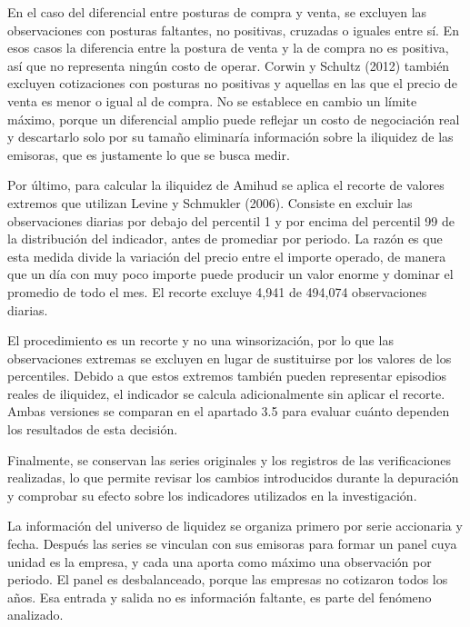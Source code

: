 En el caso del diferencial entre posturas de compra y venta, se excluyen las observaciones con posturas faltantes, no positivas, cruzadas o iguales entre sí. En esos casos la diferencia entre la postura de venta y la de compra no es positiva, así que no representa ningún costo de operar. Corwin y Schultz (2012) también excluyen cotizaciones con posturas no positivas y aquellas en las que el precio de venta es menor o igual al de compra. No se establece en cambio un límite máximo, porque un diferencial amplio puede reflejar un costo de negociación real y descartarlo solo por su tamaño eliminaría información sobre la iliquidez de las emisoras, que es justamente lo que se busca medir.

Por último, para calcular la iliquidez de Amihud se aplica el recorte de valores extremos que utilizan Levine y Schmukler (2006). Consiste en excluir las observaciones diarias por debajo del percentil 1 y por encima del percentil 99 de la distribución del indicador, antes de promediar por periodo. La razón es que esta medida divide la variación del precio entre el importe operado, de manera que un día con muy poco importe puede producir un valor enorme y dominar el promedio de todo el mes. El recorte excluye 4,941 de 494,074 observaciones diarias.

El procedimiento es un recorte y no una winsorización, por lo que las observaciones extremas se excluyen en lugar de sustituirse por los valores de los percentiles. Debido a que estos extremos también pueden representar episodios reales de iliquidez, el indicador se calcula adicionalmente sin aplicar el recorte. Ambas versiones se comparan en el apartado 3.5 para evaluar cuánto dependen los resultados de esta decisión.

Finalmente, se conservan las series originales y los registros de las verificaciones realizadas, lo que permite revisar los cambios introducidos durante la depuración y comprobar su efecto sobre los indicadores utilizados en la investigación.


La información del universo de liquidez se organiza primero por serie accionaria y fecha. Después las series se vinculan con sus emisoras para formar un panel cuya unidad es la empresa, y cada una aporta como máximo una observación por periodo. El panel es desbalanceado, porque las empresas no cotizaron todos los años. Esa entrada y salida no es información faltante, es parte del fenómeno analizado.

